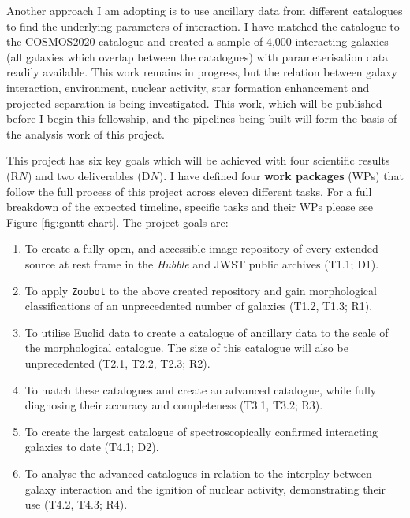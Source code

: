 \documentclass[11pt]{article}
\begin{document}
Another approach I am adopting is to use ancillary data from different catalogues to find the underlying parameters of interaction. I have matched the \citet{2023ApJ...948...40O} catalogue to the COSMOS2020 \citep{2022ApJS..258...11W} catalogue and created a sample of 4,000 interacting galaxies (all galaxies which overlap between the catalogues) with parameterisation data readily available. This work remains in progress, but the relation between galaxy interaction, environment, nuclear activity, star formation enhancement and projected separation is being investigated. This work, which will be published before I begin this fellowship, and the pipelines being built will form the basis of the analysis work of this project.

\vspace{-3mm}
\describearchival
\vspace{-3mm}
This project has six key goals which will be achieved with four scientific results (R$N$) and two deliverables (D$N$). I have defined four \textbf{work packages} (WPs) that follow the full process of this project across eleven different tasks. For a full breakdown of the expected timeline, specific tasks and their WPs please see Figure \ref{fig:gantt-chart}. The project goals are:
\begin{enumerate}[itemsep=0pt, parsep=0pt, topsep=5pt]
    \item To create a fully open, and accessible image repository of every extended source at rest frame in the \textit{Hubble} and JWST public archives (T1.1; D1). 
    \item To apply \texttt{Zoobot} to the above created repository and gain morphological classifications of an unprecedented number of galaxies (T1.2, T1.3; R1).
    \item To utilise Euclid data to create a catalogue of ancillary data to the scale of the morphological catalogue. The size of this catalogue will also be unprecedented (T2.1, T2.2, T2.3; R2).
    \item To match these catalogues and create an advanced catalogue, while fully diagnosing their accuracy and completeness (T3.1, T3.2; R3).
    \item To create the largest catalogue of spectroscopically confirmed interacting galaxies to date (T4.1; D2).
    \item To analyse the advanced catalogues in relation to the interplay between galaxy interaction and the ignition of nuclear activity, demonstrating their use (T4.2, T4.3; R4).
\end{enumerate}
\end{document}
